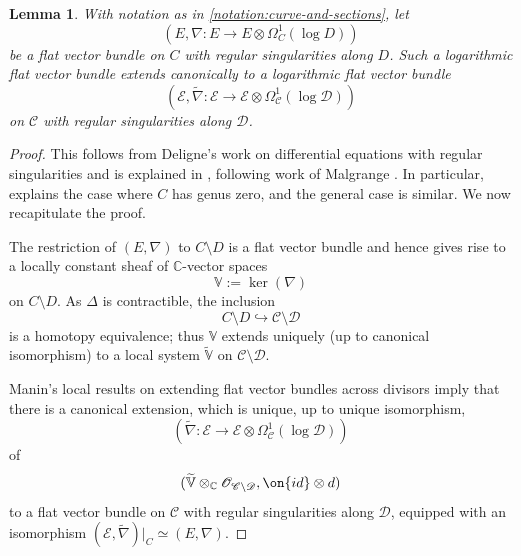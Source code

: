 \documentclass[12 pt]{amsart}
\theoremstyle{plain}
\newtheorem{lemma}[subsubsection]{Lemma}
\theoremstyle{definition}
\theoremstyle{remark}
\numberwithin{equation}{section}
\begin{document}
\begin{lemma}
	\label{lemma:iso-extension}
	With notation as in \autoref{notation:curve-and-sections}, let $$(E, \nabla: E \to E\otimes \Omega^1_C(\log
	D))$$ be a flat vector bundle on $C$ with regular singularities along
	$D$. Such a logarithmic flat vector bundle extends canonically to a
	logarithmic flat vector bundle $$(\mathscr{E}, \widetilde{\nabla}:
	\mathscr{E}\to \mathscr{E}\otimes \Omega^1_{\mathscr{C}}(\log
\mathscr{D}))$$ on $\mathscr{C}$ with regular singularities along $\mathscr{D}$.
\end{lemma}
\begin{proof}
	This follows from Deligne's work on differential equations
with regular singularities \cite{deligne:regular-singular} and is explained in
\cite[Theorem 3.4]{Heu:universal-isomonodromic}, following work of Malgrange
\cite{malgrange:I, malgrange:II}.
In particular, \cite[Theoreme 2.1]{malgrange:I} explains the case where $C$ has
genus zero, and the general case is similar. 
We now recapitulate the proof.

The restriction
of $({E}, \nabla)$ to $C\setminus D$ is a flat vector bundle and hence
gives rise to a locally constant sheaf of $\mathbb{C}$-vector spaces
$$\mathbb{V}:=\ker(\nabla)$$ on $C\setminus D$. As $\Delta$ is contractible, the
inclusion $$C\setminus D\hookrightarrow \mathscr{C}\setminus \mathscr{D}$$ is a
homotopy equivalence; thus $\mathbb{V}$ extends uniquely (up to canonical
isomorphism) to a local system $\widetilde{\mathbb{V}}$ on $\mathscr{C}\setminus
\mathscr{D}$. 

Manin's local results on extending flat vector bundles across divisors
\cite[Proposition 5.4]{deligne:regular-singular} imply that there is a
canonical extension, which is unique, up to unique isomorphism,
$$(\widetilde{\nabla}:
\mathscr{E}\to \mathscr{E}\otimes \Omega^1_{\mathscr{C}}(\log \mathscr{D}))$$ of
$$(\widetilde{\mathbb V}\otimes_{\mathbb{C}}\mathscr{O}_{\mathscr{C}\setminus
\mathscr{D}}, \on{id}\otimes d)$$ to a flat vector bundle on $\mathscr{C}$ with
regular singularities along $\mathscr{D}$, equipped with an isomorphism
$({\mathscr{E}}, \widetilde{\nabla})|_C\simeq (E,\nabla).$
\end{proof}
\end{document}
